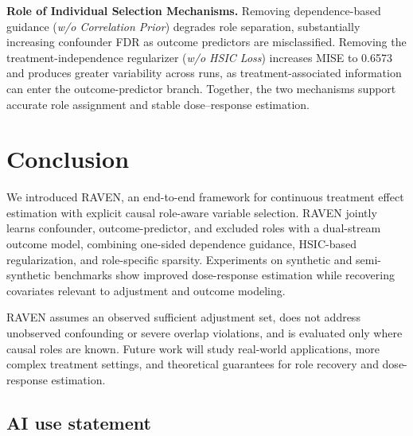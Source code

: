\documentclass[twoside]{article}
\theoremstyle{plain}
\theoremstyle{definition}
\theoremstyle{remark}
\newtheorem{proof sketch}[theorem]{Proof Sketch}
\begin{document}
\textbf{Role of Individual Selection Mechanisms.}
Removing dependence-based guidance (\textit{w/o Correlation Prior}) degrades role separation, substantially increasing confounder FDR as outcome predictors are misclassified.
Removing the treatment-independence regularizer (\textit{w/o HSIC Loss}) increases MISE to 0.6573 and produces greater variability across runs, as treatment-associated information can enter the outcome-predictor branch.
Together, the two mechanisms support accurate role assignment and stable dose--response estimation.

\section{Conclusion}
We introduced RAVEN, an end-to-end framework for continuous treatment effect estimation with explicit causal role-aware variable selection. 
RAVEN jointly learns confounder, outcome-predictor, and excluded roles with a dual-stream outcome model, combining one-sided dependence guidance, HSIC-based regularization, and role-specific sparsity. 
Experiments on synthetic and semi-synthetic benchmarks show improved dose-response estimation while recovering covariates relevant to adjustment and outcome modeling.

RAVEN assumes an observed sufficient adjustment set, does not address unobserved confounding or severe overlap violations, and is evaluated only where causal roles are known. Future work will study real-world applications, more complex treatment settings, and theoretical guarantees for role recovery and dose-response estimation.

\subsection*{AI use statement}
\end{document}
